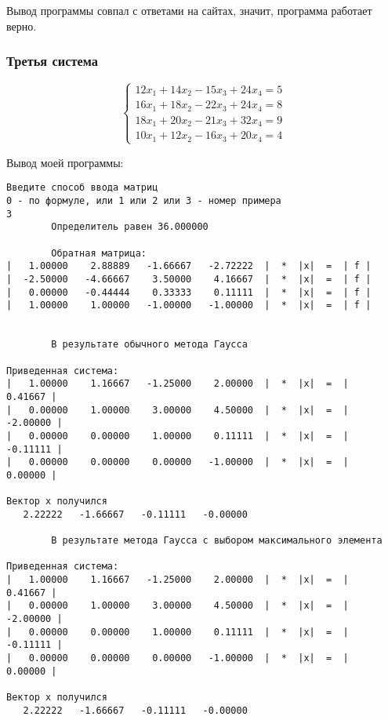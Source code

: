 \documentclass[a4paper,12pt,titlepage,finall]{article}
\begin{document}
Вывод программы совпал с ответами на сайтах, значит, программа работает верно.

\subsubsection{Третья система}

\begin{equation*}
 \begin{cases}
   12x_1 + 14x_2 - 15x_3 + 24x_4 = 5 
   \\
   16x_1 + 18x_2 - 22x_3 + 24x_4 = 8
   \\
   18x_1 + 20x_2 - 21x_3 + 32x_4 = 9
   \\
   10x_1 + 12x_2 - 16x_3 + 20x_4 = 4
 \end{cases}
\end{equation*}


Вывод моей программы:

\begin{verbatim}
Введите способ ввода матриц
0 - по формуле, или 1 или 2 или 3 - номер примера
3
        Определитель равен 36.000000

        Обратная матрица:
|   1.00000    2.88889   -1.66667   -2.72222  |  *  |x|  =  | f |
|  -2.50000   -4.66667    3.50000    4.16667  |  *  |x|  =  | f |
|   0.00000   -0.44444    0.33333    0.11111  |  *  |x|  =  | f |
|   1.00000    1.00000   -1.00000   -1.00000  |  *  |x|  =  | f |


        В результате обычного метода Гаусса

Приведенная система:
|   1.00000    1.16667   -1.25000    2.00000  |  *  |x|  =  |   0.41667 |
|   0.00000    1.00000    3.00000    4.50000  |  *  |x|  =  |  -2.00000 |
|   0.00000    0.00000    1.00000    0.11111  |  *  |x|  =  |  -0.11111 |
|   0.00000    0.00000    0.00000   -1.00000  |  *  |x|  =  |   0.00000 |

Вектор х получился
   2.22222   -1.66667   -0.11111   -0.00000 

        В результате метода Гаусса с выбором максимального элемента

Приведенная система:
|   1.00000    1.16667   -1.25000    2.00000  |  *  |x|  =  |   0.41667 |
|   0.00000    1.00000    3.00000    4.50000  |  *  |x|  =  |  -2.00000 |
|   0.00000    0.00000    1.00000    0.11111  |  *  |x|  =  |  -0.11111 |
|   0.00000    0.00000    0.00000   -1.00000  |  *  |x|  =  |   0.00000 |

Вектор х получился
   2.22222   -1.66667   -0.11111   -0.00000 

\end{verbatim}
\end{document}
